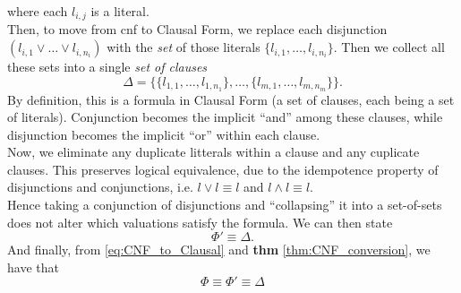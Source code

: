 where each \(l_{i,j}\) is a literal.
\\
Then, to move from \acrshort{cnf} to Clausal Form, we replace each disjunction \( (l_{i,1} \vee \ldots \vee l_{i,n_i}) \) with the \emph{set} of those literals \(\{l_{i,1}, \ldots, l_{i,n_i}\}\). Then we collect all these sets into a single \emph{set of clauses}
\begin{equation*}
    \Delta = \bigg\{
        \{l_{1,1}, \ldots, l_{1,n_1}\}, \ldots, \{l_{m,1}, \ldots, l_{m,n_m}\}
    \bigg\}.
\end{equation*}
By definition, this is a formula in Clausal Form (a set of clauses, each being a set of literals). Conjunction becomes the implicit “and” among these clauses, while disjunction becomes the implicit “or” within each clause.
\\
Now, we eliminate any duplicate litterals within a clause and any cuplicate clauses. This preserves logical equivalence, due to the idempotence property of disjunctions and conjunctions, i.e. \(l \vee l \equiv l\) and \(l \wedge l \equiv l\).
\\
Hence taking a conjunction of disjunctions and “collapsing” it into a set-of-sets does not alter which valuations satisfy the formula. We can then state
\begin{equation}\label{eq:CNF_to_Clausal}
    \Phi' \equiv \Delta.
\end{equation}
And finally, from \autoref{eq:CNF_to_Clausal} and \textbf{thm} \ref{thm:CNF_conversion}, we have that
\begin{equation*}
    \Phi \equiv \Phi' \equiv \Delta \tag*{\(\blacksquare\).}
\end{equation*}

